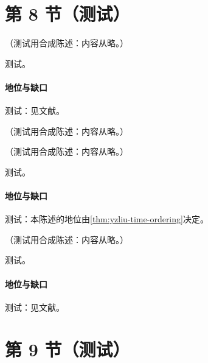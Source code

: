 \section{第 8 节（测试）}\label{sec:yzliu-threshold}

\begin{proposition}\label{prop:yzliu-sivers}
（测试用合成陈述：内容从略。）
\end{proposition}
\begin{proofsketch}测试。\end{proofsketch}
\paragraph{地位与缺口}测试：见文献。

\begin{definition}\label{def:yzliu-hl-jet}
（测试用合成陈述：内容从略。）
\end{definition}

\begin{theorem}\label{thm:yzliu-jet-continuation}
（测试用合成陈述：内容从略。）
\end{theorem}
\begin{proofsketch}测试。\end{proofsketch}
\paragraph{地位与缺口}测试：本陈述的地位由\cref{thm:yzliu-time-ordering}决定。

\begin{theorem}\label{thm:yzliu-threshold}
（测试用合成陈述：内容从略。）
\end{theorem}
\begin{proofsketch}测试。\end{proofsketch}
\paragraph{地位与缺口}测试：见文献。

\section{第 9 节（测试）}\label{sec:yzliu-renormalon}

